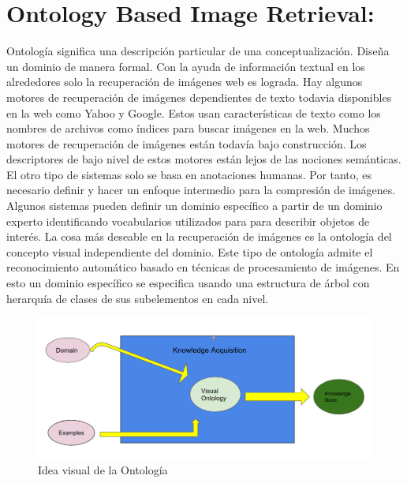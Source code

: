 \documentclass{llncs}
\begin{document}
\section*{Ontology Based Image Retrieval:}
Ontolog\'ia significa una descripci\'on particular de una conceptualizaci\'on. Dise\~{n}a un dominio de manera formal. Con la ayuda 
de informaci\'on textual en los alrededores solo la recuperaci\'on de im\'agenes web es lograda. Hay algunos motores de recuperaci\'on 
de im\'agenes dependientes de texto todavia disponibles en la web como Yahoo y Google. Estos usan caracter\'isticas de texto como 
los nombres de archivos como \'indices para buscar im\'agenes en la web. Muchos motores de recuperaci\'on de im\'agenes est\'an todav\'ia 
bajo construcci\'on. Los descriptores de bajo nivel de estos motores est\'an lejos de las nociones sem\'anticas. El otro tipo de sistemas
solo se basa en anotaciones humanas. Por tanto, es necesario definir y hacer un enfoque intermedio para la compresi\'on de im\'agenes. 
Algunos sistemas pueden definir un dominio espec\'ifico a partir de un dominio experto  identificando vocabularios utilizados para 
para describir objetos de inter\'es. La cosa m\'as deseable en la recuperaci\'on de im\'agenes es la ontolog\'ia del concepto visual 
independiente del dominio. Este tipo de ontolog\'ia admite el reconocimiento autom\'atico basado en t\'ecnicas de procesamiento de 
im\'agenes.  En esto un dominio espec\'ifico se especifica usando una estructura de \'arbol con herarqu\'ia de clases de sus subelementos 
en cada nivel.

\begin{figure}
    \caption{Idea visual de la Ontolog\'ia}
    \includegraphics[scale = .3]{./images/visual_idea_ontology.png}
\end{figure}

\noindent
\end{document}
